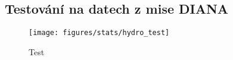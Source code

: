 
\subsection{Testování na datech z mise DIANA}
\label{subsec:ml_diana_data_test}

\begin{figure}[!htb]
    \begin{center}
        \texttt{[image: figures/stats/hydro\_test]}
        \caption{Test}
        \label{fig:hydro_test}
    \end{center}
\end{figure}